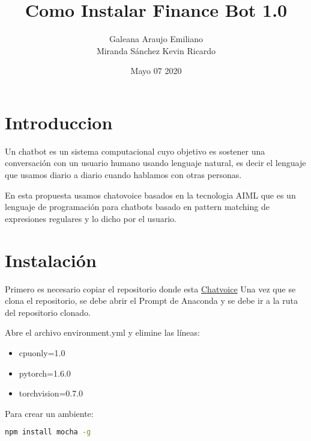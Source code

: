 \documentclass{article}
\title{\huge Como Instalar Finance Bot 1.0}
\author{Galeana Araujo Emiliano \\ Miranda Sánchez Kevin Ricardo \\}
\date{Mayo 07 2020}
\begin{document}
\maketitle

\newpage

\section{Introduccion}

\justifying
Un chatbot es un sistema computacional cuyo objetivo es sostener una conversación con un usuario humano usando lenguaje natural, es decir el lenguaje que usamos diario a diario cuando hablamos con otras personas.\par

En esta propuesta usamos chatovoice basados en la tecnologia AIML que es un lenguaje de programación para chatbots basado en pattern matching de expresiones regulares y lo dicho por el usuario.

\newpage
\section{Instalación}
Primero es necesario copiar el repositorio donde esta \href{https://github.com/ivanvladimir/chatvoice}{Chatvoice}
Una vez que se clona el repositorio, se debe abrir el Prompt de Anaconda y se debe ir a la ruta del repositorio clonado.\par

Abre el archivo environment.yml y elimine las líneas:
\begin{itemize}
\item cpuonly=1.0
\item pytorch=1.6.0
\item torchvision=0.7.0
\end{itemize}

Para crear un ambiente:

\begin{lstlisting}[frame=single,language=bash,caption=etiqueta]
  npm install mocha -g
\end{lstlisting}


\end{document}
